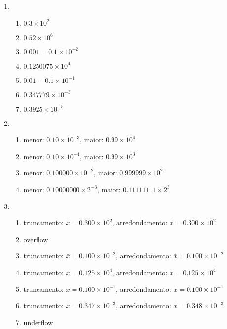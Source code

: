\documentclass[a4paper]{article}
\begin{document}
\begin{enumerate}
\item
  \begin{enumerate}
  \item $0.3 \times 10^2$
  \item $0.52 \times 10^6$
  \item $0.001 = 0.1 \times 10^{-2}$
  \item $0.1250075 \times 10^{4}$
  \item $0.01 = 0.1 \times 10^{-1}$
  \item $0.347779 \times 10^{-3}$
  \item $0.3925 \times 10^{-5}$
  \end{enumerate}

\item
  \begin{enumerate}
  \item menor: $0.10 \times 10^{-3}$, maior: $0.99 \times 10^4$
  \item menor: $0.10 \times 10^{-4}$, maior: $0.99 \times 10^3$
  \item menor: $0.100000 \times 10^{-2}$, maior: $0.999999 \times 10^2$
  \item menor: $0.10000000 \times 2^{-3}$, maior: $0.11111111 \times 2^3$
  \end{enumerate}


\item %
  \begin{enumerate}
  \item truncamento: $\bar{x} = 0.300 \times 10^2$, arredondamento: $\bar{x}=0.300 \times 10^2$
  \item overflow
  \item truncamento: $\bar{x} = 0.100 \times 10^{-2}$, arredondamento: $\bar{x}=0.100 \times 10^{-2}$
  \item truncamento: $\bar{x} = 0.125 \times 10^{4}$, arredondamento: $\bar{x} = 0.125 \times 10^{4}$
  \item truncamento: $\bar{x} = 0.100 \times 10^{-1}$, arredondamento: $\bar{x} = 0.100 \times 10^{-1}$
  \item truncamento: $\bar{x} = 0.347 \times 10^{-3}$, arredondamento: $\bar{x} = 0.348 \times 10^{-3}$
  \item underflow
  \end{enumerate}


\end{enumerate}
\end{document}
